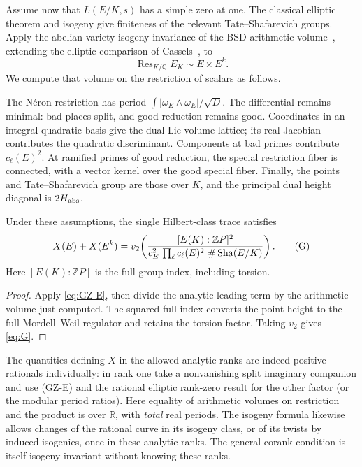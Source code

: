 Assume now that \(L(E/K,s)\) has a simple zero at one. The classical
elliptic theorem and isogeny give finiteness of the relevant
Tate--Shafarevich groups. Apply the abelian-variety isogeny invariance
of the BSD arithmetic volume~\cite[Theorem~2.1]{Tate1966}, extending
the elliptic comparison of Cassels~\cite{Cassels65}, to
\[
 \operatorname{Res}_{K/\mathbb Q}E_K\sim E\times E^k.
\]
We compute that volume on the restriction of scalars as follows.

The Néron restriction has period
\(\int|\omega_E\wedge\bar\omega_E|/\sqrt D\).
The differential remains minimal: bad places split, and good reduction
remains good. Coordinates in an integral quadratic basis give the
dual Lie-volume lattice; its real Jacobian contributes the quadratic
discriminant. Components at bad primes contribute \(c_\ell(E)^2\).
At ramified primes of good reduction, the special restriction fiber
is connected, with a vector kernel over the good special fiber.
Finally, the points and Tate--Shafarevich group are those over \(K\),
and the principal dual height diagonal is \(2H_{\rm abs}\).

\begin{corollary}\label{cor:classical-G}
Under these assumptions, the single Hilbert-class trace satisfies
\[
  X(E)+X(E^k)
  =v_2\!\left(\frac{[E(K):\mathbb ZP]^2}
      {c_E^2\,\prod_\ell c_\ell(E)^2\ \#\Sha(E/K)}\right).       \tag{G}\label{eq:G}
\]
Here \([E(K):\mathbb ZP]\) is the full group index, including torsion.
\end{corollary}

\begin{proof}
Apply \eqref{eq:GZ-E}, then divide the analytic leading term by the arithmetic volume just computed. The squared full index converts the point height to the full Mordell--Weil regulator and retains the torsion factor. Taking \(v_2\) gives \eqref{eq:G}.
\end{proof}
The quantities defining \(X\) in the allowed analytic ranks are indeed positive rationals individually: in rank one take a nonvanishing split imaginary companion and use (GZ-E) and the rational elliptic rank-zero result for the other factor (or the modular period ratios). Here equality of arithmetic volumes on restriction and the product is over \(\mathbb R\), with \emph{total} real periods. The isogeny formula likewise allows changes of the rational curve in its isogeny class, or of its twists by induced isogenies, once in these analytic ranks. The general corank condition is itself isogeny-invariant without knowing these ranks. 

